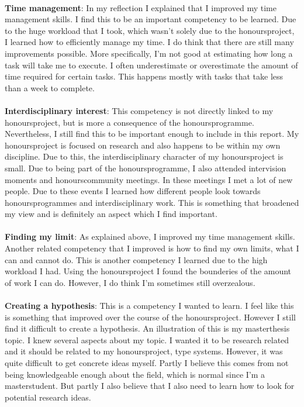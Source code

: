 \\
\textbf{Time management}: In my reflection I explained that I improved my time management skills. I find this to be an important competency to be learned. Due to the huge workload that I took, which wasn't solely due to the honoursproject, I learned how to efficiently manage my time. I do think that there are still many improvements possible. More specifically, I'm not good at estimating how long a task will take me to execute. I often underestimate or overestimate the amount of time required for certain tasks. This happens mostly with tasks that take less than a week to complete.  \\
\\
\textbf{Interdisciplinary interest}: This competency is not directly linked to my honoursproject, but is more a consequence of the honoursprogramme. Nevertheless, I still find this to be important enough to include in this report. My honoursproject is focused on research and also happens to be within my own discipline. Due to this, the interdisciplinary character of my honoursproject is small.  Due to being part of the honoursprogramme, I also attended intervision moments and honourscommunity meetings. In these meetings I met a lot of new people. Due to these events I learned how different people look towards honoursprogrammes and interdisciplinary work. This is something that broadened my view and is definitely an aspect which I find important. \\
\\
\textbf{Finding my limit}:  As explained above, I improved my time management skills. Another related competency that I improved is how to find my own limits, what I can and cannot do. This is another competency I learned due to the high workload I had. Using the honoursproject I found the bounderies of the amount of work I can do. However, I do think I'm sometimes still overzealous. \\
\\
\textbf{Creating a hypothesis}: This is a competency I wanted to learn. I feel like this is something that improved over the course of the honoursproject. However I still find it difficult to create a hypothesis. An illustration of this is my masterthesis topic. I knew several aspects about my topic. I wanted it to be research related and it should be related to my honoursproject, type systems. However, it was quite difficult to get concrete ideas myself. Partly I believe this comes from not being knowledgeable enough about the field, which is normal since I'm a masterstudent. But partly I also believe that I also need to learn how to look for potential research ideas. 